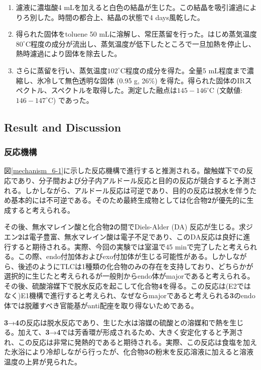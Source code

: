 \documentclass{ltjsarticle}
\theoremstyle{definition}
\numberwithin{equation}{section}
\newcommand{\D}{^\circ\text{C}}
\begin{document}
\begin{enumerate}
\item 濾液に濃塩酸4 mLを加えると白色の結晶が生じた。この結晶を吸引濾過によりろ別した。時間の都合上、結晶の状態で4 days風乾した。
\item 得られた固体をtoluene 50 mLに溶解し、常圧蒸留を行った。はじめ蒸気温度$80\D$程度の成分が流出し、蒸気温度が低下したところで一旦加熱を停止し、熱時濾過により固体を除去した。
\item さらに蒸留を行い、蒸気温度$102\D$程度の成分を得た。全量5 mL程度まで濃縮し、氷冷して無色透明な固体 (0.95 g, 26\%) を得た。得られた固体のIRスペクトル、スペクトルを取得した。測定した融点は$145-146\D$ (文献値: $146-147\D$) であった。
\end{enumerate}

\subsection{Result and Discussion}
\subsubsection{反応機構}

図\ref{mechanism_6-1}に示した反応機構で進行すると推測される。酸触媒下での反応であり、分子間および分子内アルドール反応と目的の反応が競合すると予測される。しかしながら、アルドール反応は可逆であり、目的の反応は脱水を伴うため基本的には不可逆である。そのため最終生成物としては化合物\textbf{2}が優先的に生成すると考えられる。

その後、無水マレイン酸と化合物\textbf{2}の間でDiels-Alder (DA) 反応が生じる。求ジエン\textbf{2}は電子豊富、無水マレイン酸は電子不足であり、このDA反応は良好に進行すると期待される。実際、今回の実験では室温で45 minで完了したと考えられる。この際、endo付加体およびexo付加体が生じる可能性がある。しかしながら、後述のようにTLCは1種類の化合物のみの存在を支持しており、どちらかが選択的に生じたと考えられるが一般則からendo体がmajorであると考えられる。
その後、硫酸溶媒下で脱水反応を起こして化合物\textbf{4}を得る。この反応は(E2ではなく)E1機構で進行すると考えられ、なぜならmajorであると考えられる\textbf{3}のendo体では脱離すべき官能基がanti配座を取り得ないためである。

\textbf{3}→\textbf{4}の反応は脱水反応であり、生じた水は溶媒の硫酸との溶媒和で熱を生じる。加えて、\textbf{3}→\textbf{4}では芳香環が形成されるため、大きく安定化すると予測され、この反応は非常に発熱的であると期待される。実際、この反応は食塩を加えた氷浴により冷却しながら行ったが、化合物\textbf{3}の粉末を反応溶液に加えると溶液温度の上昇が見られた。
\end{document}
